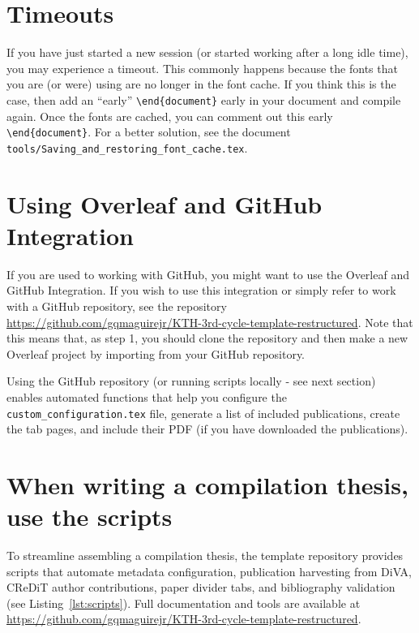 \documentclass{article}
\newcommand{\fname}[1]{\texttt{#1}}
\begin{document}
\section*{Timeouts}
If you have just started a new session (or started working after a long idle time), you may experience a timeout. This commonly happens because the fonts that you are (or were) using are no longer in the font cache. If you think this is the case, then add an \enquote{early} \texttt{\textbackslash end\{document\}} early in your document and compile again. Once the fonts are cached, you can comment out this early \texttt{\textbackslash end\{document\}}. For a better solution, see the document \fname{tools/Saving\_and\_restoring\_font\_cache.tex}.

\section*{Using Overleaf and GitHub Integration}
If you are used to working with GitHub, you might want to use the Overleaf and GitHub Integration. 
If you wish to use this integration or simply refer to work with a GitHub repository, see the repository \url{https://github.com/gqmaguirejr/KTH-3rd-cycle-template-restructured}.
Note that this means that, as step 1, you should clone the repository and then make a new Overleaf project by importing from your GitHub repository.

Using the GitHub repository (or running scripts locally - see next section) enables automated functions that help you configure the \fname{custom\_configuration.tex} file, generate a list of included publications, create the tab pages, and include their PDF (if you have downloaded the publications).


\section*{When writing a compilation thesis, use the scripts}
To streamline assembling a compilation thesis, the template repository provides scripts that automate metadata configuration, publication harvesting from DiVA, CReDiT author contributions, paper divider tabs, and bibliography validation (see Listing~\ref{lst:scripts}). Full documentation and tools are available at \url{https://github.com/gqmaguirejr/KTH-3rd-cycle-template-restructured}.
\end{document}
